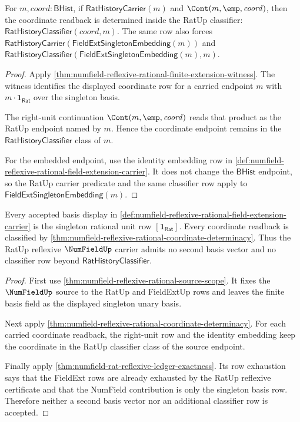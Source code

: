 \begin{theorem}
\label{thm:numfield-reflexive-rational-coordinate-determinacy}
For $m,\mathit{coord}:\mathsf{BHist}$, if
$\mathsf{RatHistoryCarrier}(m)$ and $\Cont(m,\emp,\mathit{coord})$, then the
coordinate readback is determined inside the RatUp classifier:
$\mathsf{RatHistoryClassifier}(\mathit{coord},m)$. The same row also forces
$\mathsf{RatHistoryCarrier}(\mathsf{FieldExtSingletonEmbedding}(m))$ and
$\mathsf{RatHistoryClassifier}(\mathsf{FieldExtSingletonEmbedding}(m),m)$.
\end{theorem}
\begin{proof}
Apply
\autoref{thm:numfield-reflexive-rational-finite-extension-witness}. The witness
identifies the displayed coordinate row for a carried endpoint $m$ with
$m\cdot\mathbf{1}_{\mathsf{Rat}}$ over the singleton basis.

The right-unit continuation $\Cont(m,\emp,\mathit{coord})$ reads that product as
the RatUp endpoint named by $m$. Hence the coordinate endpoint remains in the
$\mathsf{RatHistoryClassifier}$ class of $m$.

For the embedded endpoint, use the identity embedding row in
\autoref{def:numfield-reflexive-rational-field-extension-carrier}. It does not
change the $\mathsf{BHist}$ endpoint, so the RatUp carrier predicate and the
same classifier row apply to
$\mathsf{FieldExtSingletonEmbedding}(m)$.
\end{proof}

\begin{theorem}
\label{thm:numfield-reflexive-rational-basis-row-exhaustion}
Every accepted basis display in
\autoref{def:numfield-reflexive-rational-field-extension-carrier} is the
singleton rational unit row $[\mathbf{1}_{\mathsf{Rat}}]$. Every coordinate
readback is classified by
\autoref{thm:numfield-reflexive-rational-coordinate-determinacy}. Thus the
RatUp reflexive $\NumFieldUp$ carrier admits no second basis vector and no
classifier row beyond $\mathsf{RatHistoryClassifier}$.
\end{theorem}
\begin{proof}
First use
\autoref{thm:numfield-reflexive-rational-source-scope}. It fixes the
$\NumFieldUp$ source to the RatUp and FieldExtUp rows and leaves the finite
basis field as the displayed singleton unary basis.

Next apply
\autoref{thm:numfield-reflexive-rational-coordinate-determinacy}. For each
carried coordinate readback, the right-unit row and the identity embedding keep
the coordinate in the RatUp classifier class of the source endpoint.

Finally apply \autoref{thm:numfield-rat-reflexive-ledger-exactness}. Its row
exhaustion says that the FieldExt rows are already exhausted by the RatUp
reflexive certificate and that the NumField contribution is only the singleton
basis row. Therefore neither a second basis vector nor an additional classifier
row is accepted.
\end{proof}

